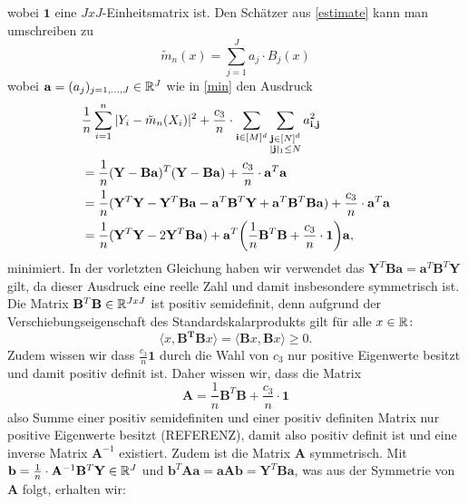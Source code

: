 wobei $\mathbf{1}$ eine $JxJ$-Einheitsmatrix ist.
Den Schätzer aus \ref{estimate} kann man umschreiben zu 
$$ \tilde{m}_n(x) = \sum_{j = 1}^J a_j \cdot B_j(x)$$
wobei $\mathbf{a} = (a_j)_{j = 1,\dots,J} \in \mathbb{R}^J$ wie in \ref{min} den Ausdruck
\begin{equation}
\begin{split}
& \frac{1}{n} \sum_{i = 1}^n|Y_i - \tilde{m}_n(X_i)|^2 + \frac{c_3}{n} \cdot \sum_{\mathbf{i} \in [M]^d} \sum_{\substack{\mathbf{j} \in [N]^d\\|\mathbf{j}|_1 \leq N}} a_{\mathbf{i},\mathbf{j}}^2 \\
& = \frac{1}{n}(\mathbf{Y} - \mathbf{B}\mathbf{a})^T(\mathbf{Y} - \mathbf{B}\mathbf{a}) + \frac{c_3}{n} \cdot \mathbf{a}^T\mathbf{a} \\
& = \frac{1}{n}(\mathbf{Y}^T\mathbf{Y} - \mathbf{Y}^T\mathbf{B}\mathbf{a} - \mathbf{a}^T\mathbf{B}^T\mathbf{Y} + \mathbf{a}^T\mathbf{B}^T\mathbf{B}\mathbf{a}) + \frac{c_3}{n} \cdot \mathbf{a}^T\mathbf{a} \\
& = \frac{1}{n}(\mathbf{Y}^T\mathbf{Y} - 2\mathbf{Y}^T\mathbf{B}\mathbf{a}) + \mathbf{a}^T\bigg(\frac{1}{n} \mathbf{B}^T\mathbf{B} + \frac{c_3}{n} \cdot \mathbf{1}\bigg) \mathbf{a}, 
\end{split}
\end{equation} 
minimiert. In der vorletzten Gleichung haben wir verwendet das $\mathbf{Y}^T\mathbf{B}\mathbf{a} = \mathbf{a}^T\mathbf{B}^T\mathbf{Y}$ gilt, da dieser Ausdruck eine reelle Zahl und damit insbesondere symmetrisch ist. 
Die Matrix $\mathbf{B}^T\mathbf{B} \in \mathbb{R}^{JxJ}$ ist positiv semidefinit, denn aufgrund der Verschiebungseigenschaft des Standardskalarprodukts gilt für alle $x \in \mathbb{R}\colon$
$$\langle x, \mathbf{B^T}\mathbf{B} x\rangle = \langle \mathbf{B} x, \mathbf{B} x\rangle \geq 0.$$
Zudem wissen wir dass $\frac{c_3}{n}\mathbf{1}$ durch die Wahl von $c_3$ nur positive Eigenwerte besitzt und damit positiv definit ist.  
Daher wissen wir, dass die Matrix
$$\mathbf{A} = \frac{1}{n}\mathbf{B}^T\mathbf{B} + \frac{c_3}{n} \cdot \mathbf{1}$$ also Summe einer positiv semidefiniten und einer positiv definiten Matrix nur positive Eigenwerte besitzt (REFERENZ), damit also positiv definit ist und eine inverse Matrix $\mathbf{A}^{-1}$ existiert. Zudem ist die Matrix $\mathbf{A}$ symmetrisch. 
Mit $\mathbf{b} = \frac{1}{n} \cdot \mathbf{A}^{-1}\mathbf{B}^T\mathbf{Y} \in \mathbb{R}^J$ und $\mathbf{b}^T\mathbf{A}\mathbf{a} = \mathbf{a}\mathbf{A}\mathbf{b} = \mathbf{Y}^T\mathbf{B}\mathbf{a}$, was aus der Symmetrie von $\mathbf{A}$ folgt, erhalten wir$\colon$
